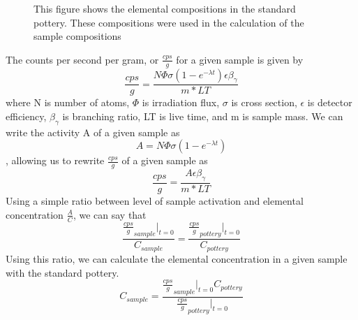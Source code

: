 \documentclass[]{article}
\begin{document}
\begin{figure}[h]
\centering
{}
\caption{This figure shows the elemental compositions in the standard pottery. These compositions were used in the calculation of the sample compositions}
\end{figure}

The counts per second per gram, or $\frac{cps}{g}$ for a given sample is given by $$\frac{cps}{g} = \frac{N\Phi\sigma(1-e^{-\lambda t})\epsilon \beta_{ \gamma}}{m * LT}$$ where N is number of atoms, $\Phi$ is irradiation flux, $\sigma$ is cross section, $\epsilon$ is detector efficiency, $\beta_{\gamma}$ is branching ratio, LT is live time, and m is sample mass. We can write the activity A of a given sample as $$A=N\Phi\sigma(1-e^{-\lambda t})$$, allowing us to rewrite $\frac{cps}{g}$ of a given sample as $$\frac{cps}{g} = \frac{A\epsilon\beta_{\gamma}}{m*LT}$$ Using a simple ratio between level of sample activation and elemental concentration $\frac{A}{C}$, we can say that $$\frac{\frac{cps}{g}_{sample}|_{t=0}}{C_{sample}} = \frac{\frac{cps}{g}_{pottery}|_{t=0}}{C_{pottery}}$$ Using this ratio, we can calculate the elemental concentration in a given sample with the standard pottery. $$C_{sample} = \frac{\frac{cps}{g}_{sample}|_{t=0} C_{pottery}}{\frac{cps}{g}_{pottery}|_{t=0}}$$
\end{document}

